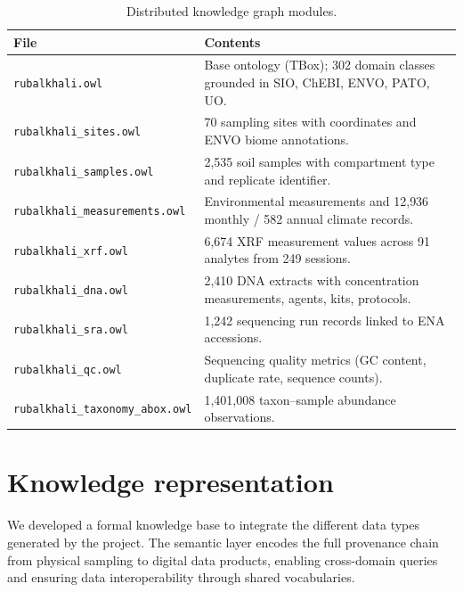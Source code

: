 \documentclass[11pt,a4paper]{article}
\begin{document}
\begin{table}[h]
  \centering
  \caption{Distributed knowledge graph modules.}
  \label{tab:modules}
  \small
  \begin{tabular}{lp{}}
    \toprule
    File & Contents \\
    \midrule
    \texttt{rubalkhali.owl} & Base ontology (TBox); 302 domain
      classes grounded in SIO, ChEBI, ENVO, PATO, UO. \\
    \texttt{rubalkhali\_sites.owl} & 70 sampling sites with
      coordinates and ENVO biome annotations. \\
    \texttt{rubalkhali\_samples.owl} & 2{,}535 soil samples with
      compartment type and replicate identifier. \\
    \texttt{rubalkhali\_measurements.owl} & Environmental measurements
      and 12{,}936 monthly / 582 annual climate records. \\
    \texttt{rubalkhali\_xrf.owl} & 6{,}674 XRF measurement values
      across 91 analytes from 249 sessions. \\
    \texttt{rubalkhali\_dna.owl} & 2{,}410 DNA extracts with
      concentration measurements, agents, kits, protocols. \\
    \texttt{rubalkhali\_sra.owl} & 1{,}242 sequencing run records
      linked to ENA accessions. \\
    \texttt{rubalkhali\_qc.owl} & Sequencing quality metrics (GC
      content, duplicate rate, sequence counts). \\
    \texttt{rubalkhali\_taxonomy\_abox.owl} & 1{,}401{,}008
      taxon--sample abundance observations. \\
    \bottomrule
  \end{tabular}
\end{table}

\section{Knowledge representation}\label{sec:kr}

We developed a formal knowledge base to integrate the different data
types generated by the project. The semantic layer encodes the full
provenance chain from physical sampling to digital data products,
enabling cross-domain queries and ensuring data interoperability
through shared vocabularies.
\end{document}
